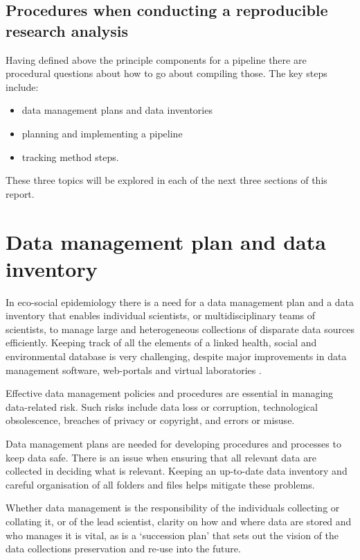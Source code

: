 \documentclass[11pt,a4paper]{article}
\begin{document}
\subsection{Procedures when conducting a reproducible research
analysis}\label{procedures-when-conducting-a-reproducible-research-analysis}

Having defined above the principle components for a pipeline there are
procedural questions about how to go about compiling those. The key
steps include:

\begin{itemize}
\itemsep1pt\parskip0pt
\item  data management plans and data inventories
\item  planning and implementing a pipeline
\item  tracking method steps.
\end{itemize}

These three topics will be explored in each of the next three sections of this report.

\section{Data management plan and data
inventory}\label{data-management-plan-and-data-inventory}

In eco-social epidemiology there is a need for a data management plan
and a data inventory that enables individual scientists, or
multidisciplinary teams of scientists, to manage large and heterogeneous
collections of disparate data sources efficiently. Keeping track of all
the elements of a linked health, social and environmental database is
very challenging, despite major improvements in data management
software, web-portals and virtual laboratories \citep{Fleming2014}.

Effective data management policies and procedures are essential in
managing data-related risk. Such risks include data loss or corruption,
technological obsolescence, breaches of privacy or copyright, and errors
or misuse. 

Data management plans are needed for developing procedures and processes
to keep data safe. There is an issue when ensuring that all relevant
data are collected in deciding what is relevant. Keeping an up-to-date
data inventory and careful organisation of all folders and files helps
mitigate these problems.

Whether data management is the responsibility of the individuals
collecting or collating it, or of the lead scientist, clarity on how and
where data are stored and who manages it is vital, as is a `succession
plan' that sets out the vision of the data collections preservation and
re-use into the future.
\end{document}
